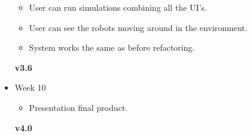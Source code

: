 \begin{itemize}
  \begin{itemize}
    \item User can run simulations combining all the UI's. 
    \item User can see the robots moving around in the environment. 
    \item System works the same as before refactoring.
  \end{itemize}
  \textbf{v3.6}
  \item Week 10 
  \begin{itemize}
    \item Presentation final product.
  \end{itemize}
  \textbf{v4.0}
\end{itemize}

